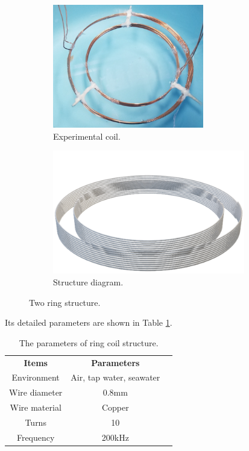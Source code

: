 \begin{figure}[htbp]
    \begin{subfigure}{0.5\textwidth}
        \centering
        \includegraphics[width=0.9\linewidth, height=5.4cm]{images/3_two_ring_coil.png}
        \caption{Experimental coil.}
        \label{fig:subim1}
    \end{subfigure}
    \begin{subfigure}{0.5\textwidth}
        \centering
        \includegraphics[width=0.9\linewidth, height=5.4cm]{images/3_two_ring_coil_structure.png}
        \caption{Structure diagram.}
        \label{fig:subim2}
    \end{subfigure}

    \caption{Two ring structure.}
    \label{fig:3_two_ring_coil}
\end{figure}

Its detailed parameters are shown in Table \ref{table:ring coil parameters}.

\begin{table}[htbp]
    \centering
    \caption{The parameters of ring coil structure.}
    \begin{tabular}{ c|cc }
        \thickhline
        \textbf{Items} & \textbf{Parameters}     \\
        \thickhline
        Environment    & Air, tap water, seawater \\ \hline
        Wire diameter  & 0.8mm                    \\ \hline
        Wire material  & Copper                   \\ \hline
        Turns          & 10                       \\ \hline
        Frequency      & 200kHz                   \\ \hline
    \end{tabular}
    \label{table:ring coil parameters}
\end{table}


